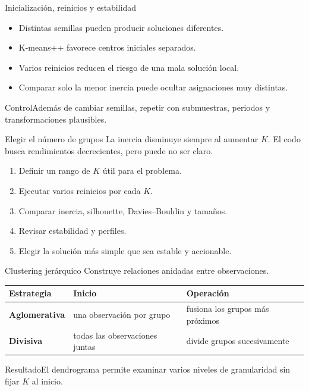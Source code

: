 \documentclass[aspectratio=169,10pt]{beamer}
\begin{document}
\begin{frame}{Inicialización, reinicios y estabilidad}
  \small
  \begin{itemize}
    \item Distintas semillas pueden producir soluciones diferentes.
    \item K-means++ favorece centros iniciales separados.
    \item Varios reinicios reducen el riesgo de una mala solución local.
    \item Comparar solo la menor inercia puede ocultar asignaciones muy distintas.
  \end{itemize}
  \begin{block}{Control}Además de cambiar semillas, repetir con submuestras, periodos y transformaciones plausibles.\end{block}
\end{frame}

\begin{frame}{Elegir el número de grupos}
  \small
  La inercia disminuye siempre al aumentar $K$. El codo busca rendimientos decrecientes, pero puede no ser claro.
  \begin{enumerate}
    \item Definir un rango de $K$ útil para el problema.
    \item Ejecutar varios reinicios por cada $K$.
    \item Comparar inercia, silhouette, Davies--Bouldin y tamaños.
    \item Revisar estabilidad y perfiles.
    \item Elegir la solución más simple que sea estable y accionable.
  \end{enumerate}
\end{frame}

\begin{frame}{Clustering jerárquico}
  \small
  Construye relaciones anidadas entre observaciones.
  \begin{tabularx}{\textwidth}{>{\bfseries}p{}XX}\toprule
  Estrategia & Inicio & Operación\\\midrule
  Aglomerativa & una observación por grupo & fusiona los grupos más próximos\\
  Divisiva & todas las observaciones juntas & divide grupos sucesivamente\\\bottomrule
  \end{tabularx}
  \begin{block}{Resultado}El dendrograma permite examinar varios niveles de granularidad sin fijar $K$ al inicio.\end{block}
\end{frame}
\end{document}
